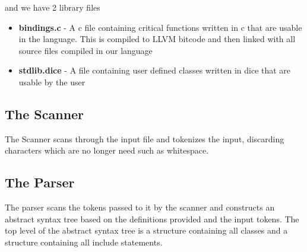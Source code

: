 \begin{homeworkProblem}
	and we have 2 library files
	\begin{itemize}
		\item \textbf{bindings.c} - A c file containing critical functions written in c that are usable in the language. This is compiled to LLVM bitcode and then linked with all source files compiled in our language
		\item \textbf{stdlib.dice} - A file containing user defined classes written in dice that are usable by the user
	\end{itemize}
	
	\subsection{The Scanner}
	The Scanner scans through the input file and tokenizes the input, discarding characters which are no longer need such as whitespace.
	
	\subsection{The Parser}
	The parser scans the tokens passed to it by the scanner and constructs an abstract syntax tree based on the definitions provided and the input tokens. The top level of the abstract syntax tree is a structure containing all classes and a structure containing all include statements.
	 

\end{homeworkProblem}
